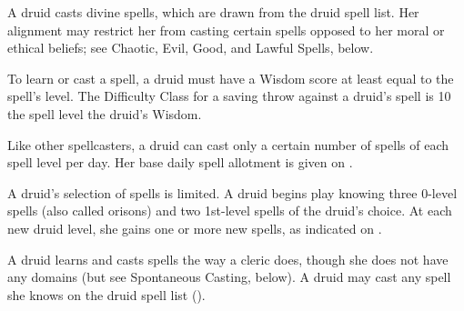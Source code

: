    A druid casts divine spells, which are drawn from the druid spell list. Her alignment may restrict her from casting certain spells opposed to her moral or ethical beliefs; see Chaotic, Evil, Good, and Lawful Spells, below.

\par To learn or cast a spell, a druid must have a Wisdom score at least equal to the spell's level. The Difficulty Class for a saving throw against a druid's spell is 10 \add the spell level \add the druid's Wisdom.

\par Like other spellcasters, a druid can cast only a certain number of spells of each spell level per day. Her base daily spell allotment is
given on .

 \par A druid's selection of spells is limited. A druid
begins play knowing three 0-level spells (also called orisons) and two
1st-level spells of the druid's choice. At each new druid level, she gains
one or more new spells, as indicated on .

\par A druid learns and casts spells the way a cleric does, though she
does not have any domains (but see Spontaneous Casting, below). A druid may cast any spell she knows
on the druid spell list ().

